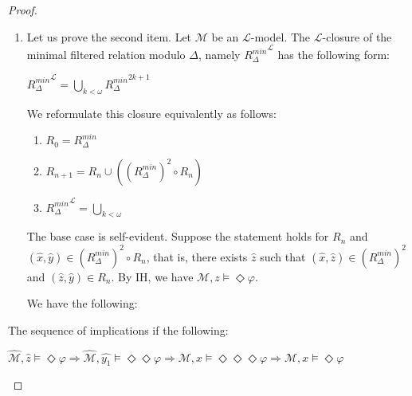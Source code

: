 \documentclass[a4paper]{article}
\theoremstyle{defin}
\theoremstyle{theorem}
\theoremstyle{prop}
\theoremstyle{lemma}
\theoremstyle{fact}
\theoremstyle{exercise}
\theoremstyle{ex}
\theoremstyle{col}
\theoremstyle{claim}
\begin{document}
\begin{proof}
\begin{enumerate}
  \item Let us prove the second item. Let $\mathcal{M}$ be an $\mathcal{L}$-model.
  The $\mathcal{L}$-closure of the minimal filtered relation modulo $\Delta$, namely ${R_{\Delta}^{min}}^{\mathcal{L}}$ has the following form:
  \begin{center}
    ${R_{\Delta}^{min}}^{\mathcal{L}} = \bigcup \limits_{k < \omega} {R_{\Delta}^{min}}^{2k + 1}$
  \end{center}
  We reformulate this closure equivalently as follows:
  \begin{enumerate}
    \item $R_0 = R_{\Delta}^{min}$
    \item $R_{n + 1} = R_n \cup ((R_{\Delta}^{min})^2 \circ R_n)$
    \item ${R_{\Delta}^{min}}^{\mathcal{L}} = \bigcup \limits_{k < \omega}$
  \end{enumerate}

  The base case is self-evident. Suppose the statement holds for $R_{n}$ and $(\hat{x}, \hat{y}) \in (R_{\Delta}^{min})^2 \circ R_n$, that is, there exists $\hat{z}$ such that $(\hat{x}, \hat{z}) \in (R_{\Delta}^{min})^2$ and $(\hat{z}, \hat{y}) \in R_n$. By IH, we have $\mathcal{M}, z \models \Diamond \varphi$.

  We have the following:

\end{enumerate}
  The sequence of implications if the following:
  \begin{center}
    $\widehat{\mathcal{M}}, \hat{z} \models \Diamond \varphi \Rightarrow \widehat{\mathcal{M}}, \widehat{y_1} \models \Diamond \Diamond \varphi \Rightarrow \mathcal{M}, x \models \Diamond \Diamond \Diamond \varphi \Rightarrow \mathcal{M}, x \models \Diamond \varphi$
  \end{center}
\end{proof}
\end{document}

